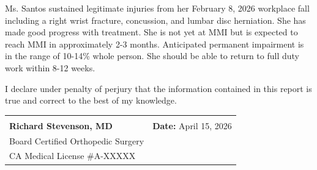 \documentclass[11pt]{article}
\begin{document}
Ms. Santos sustained legitimate injuries from her February 8, 2026 workplace fall including a right wrist fracture, concussion, and lumbar disc herniation. She has made good progress with treatment. She is not yet at MMI but is expected to reach MMI in approximately 2-3 months. Anticipated permanent impairment is in the range of 10-14\% whole person. She should be able to return to full duty work within 8-12 weeks.

\vspace{2em}

I declare under penalty of perjury that the information contained in this report is true and correct to the best of my knowledge.

\vspace{2em}

\begin{tabular}{@{}p{7cm}p{7cm}@{}}
\hrulefill & \\
\textbf{Richard Stevenson, MD} & \textbf{Date:} April 15, 2026 \\
Board Certified Orthopedic Surgery & \\
CA Medical License \#A-XXXXX & \\
\end{tabular}
\end{document}

